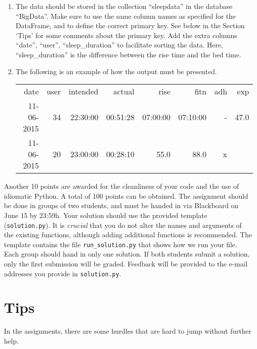 \documentclass[a4paper]{report}
\theoremstyle{definition}
\begin{document}
\begin{enumerate}

\item The data should be stored in the collection ``sleepdata'' in the
database ``BigData''.  Make sure to use the same column names as specified
for the DataFrame, and to define the correct primary key. See below in the
Section `Tips' for some comments about the primary key. Add the extra
columns ``date'', ``user'', ``sleep\_duration'' to facilitate sorting
the data. Here, ``sleep\_duration'' is the difference between the rise
time and the bed time.

\item The following is an example of how the
output must be presented.

\begin{tabular}{|r r r r r r r r|}
\hline
date & user & intended & actual & rise & fitn & adh & exp \\
11-06-2015 & 34 & 22:30:00 & 00:51:28 & 07:00:00 & 07:10:00 & - & 47.0 \\
11-06-2015 & 20 & 23:00:00 & 00:28:10 & 55.0 & 88.0 & x & \\
\hline
\end{tabular}

\end{enumerate}

Another 10 points are awarded for the cleanliness of your code and
the use of idiomatic Python. A total of 100 points can be obtained.
The assignment should be done in groups of two students, and must be
handed in via Blackboard on June 15 by 23:59h. Your solution should use
the provided template (\texttt{\small solution.py}). It is \emph{crucial}
that you do not alter the names and arguments of the existing functions,
although adding additional functions is recommended. The template
contains the file \texttt{\small run\_solution.py} that shows how we
run your file. Each group should hand in only one solution. If both
students submit a solution, only the first submission will be graded.
Feedback will be provided to the e-mail addresses you provide in
\texttt{\small solution.py}.


\section*{Tips}

In the assignments, there are some hurdles that are hard to jump without
further help.
\end{document}
